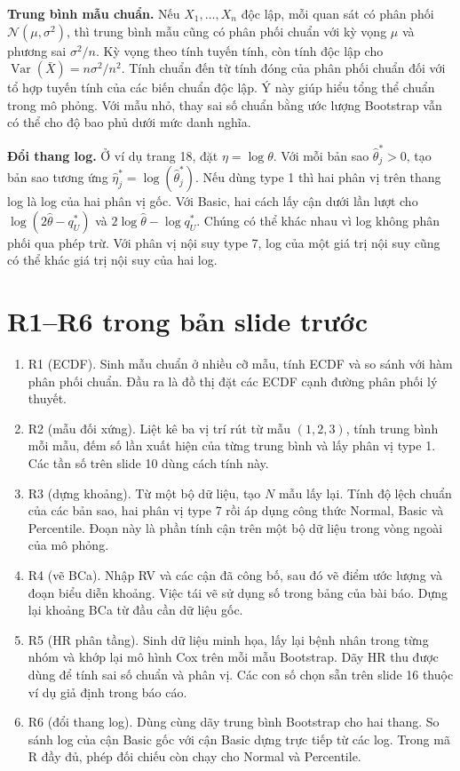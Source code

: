 \documentclass[11pt,a4paper]{article}
\begin{document}
\textbf{Trung bình mẫu chuẩn.}
Nếu $X_1,\ldots,X_n$ độc lập, mỗi quan sát có phân phối $\mathcal N(\mu,\sigma^2)$,
thì trung bình mẫu cũng có phân phối chuẩn với kỳ vọng $\mu$ và phương sai
$\sigma^2/n$. Kỳ vọng theo tính tuyến tính, còn tính độc lập cho
$\operatorname{Var}(\bar X)=n\sigma^2/n^2$. Tính chuẩn đến từ tính đóng
của phân phối chuẩn đối với tổ hợp tuyến tính của các biến chuẩn độc lập.
Ý này giúp hiểu tổng thể chuẩn trong mô phỏng. Với mẫu nhỏ, thay sai số chuẩn
bằng ước lượng Bootstrap vẫn có thể cho độ bao phủ dưới mức danh nghĩa.

\textbf{Đổi thang log.}
Ở ví dụ trang 18, đặt $\eta=\log\theta$. Với mỗi bản sao $\hat\theta_j^*>0$,
tạo bản sao tương ứng $\hat\eta_j^*=\log(\hat\theta_j^*)$.
Nếu dùng type 1 thì hai phân vị trên thang log là log của hai phân vị gốc.
Với Basic, hai cách lấy cận dưới lần lượt cho
$\log(2\hat\theta-q_U^*)$ và $2\log\hat\theta-\log q_U^*$.
Chúng có thể khác nhau vì log không phân phối qua phép trừ.
Với phân vị nội suy type 7, log của một giá trị nội suy cũng có thể khác
giá trị nội suy của hai log.

\section{R1--R6 trong bản slide trước}
\begin{enumerate}
    \item R1 (ECDF). Sinh mẫu chuẩn ở nhiều cỡ mẫu, tính ECDF và so sánh
    với hàm phân phối chuẩn. Đầu ra là đồ thị đặt các ECDF cạnh đường phân phối lý thuyết.
    \item R2 (mẫu đối xứng). Liệt kê ba vị trí rút từ mẫu $(1,2,3)$, tính
    trung bình mỗi mẫu, đếm số lần xuất hiện của từng trung bình và lấy phân vị
    type 1. Các tần số trên slide 10 dùng cách tính này.
    \item R3 (dựng khoảng). Từ một bộ dữ liệu, tạo $N$ mẫu lấy lại.
    Tính độ lệch chuẩn của các bản sao, hai phân vị type 7 rồi áp dụng
    công thức Normal, Basic và Percentile. Đoạn này là phần tính cận
    trên một bộ dữ liệu trong vòng ngoài của mô phỏng.
    \item R4 (vẽ BCa). Nhập RV và các cận đã công bố, sau đó vẽ điểm
    ước lượng và đoạn biểu diễn khoảng. Việc tái vẽ sử dụng số trong bảng
    của bài báo. Dựng lại khoảng BCa từ đầu cần dữ liệu gốc.
    \item R5 (HR phân tầng). Sinh dữ liệu minh họa, lấy lại bệnh nhân
    trong từng nhóm và khớp lại mô hình Cox trên mỗi mẫu Bootstrap.
    Dãy HR thu được dùng để tính sai số chuẩn và phân vị. Các con số
    chọn sẵn trên slide 16 thuộc ví dụ giả định trong báo cáo.
    \item R6 (đổi thang log). Dùng cùng dãy trung bình Bootstrap cho hai
    thang. So sánh log của cận Basic gốc với cận Basic dựng trực tiếp
    từ các log. Trong mã R đầy đủ, phép đối chiếu còn chạy cho Normal
    và Percentile.
\end{enumerate}
\end{document}

